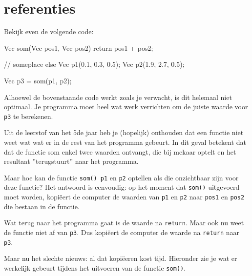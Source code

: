 \chapter{referenties}
\label{chapter:references}

Bekijk even de volgende code:

\begin{code}
Vec som(Vec pos1, Vec pos2) {
  return pos1 + pos2;
}

// someplace else
Vec p1(0.1, 0.3, 0.5);
Vec p2(1.9, 2.7, 0.5);

Vec p3 = som(p1, p2); 
\end{code}

Alhoewel de bovenstaande code werkt zoals je verwacht, is dit helemaal niet optimaal. Je programma moet heel wat werk verrichten om de juiste waarde voor \texttt{p3} te berekenen.

Uit de leerstof van het 5de jaar heb je (hopelijk) onthouden dat een functie niet weet wat wat er in de rest van het programma gebeurt. In dit geval betekent dat dat de functie som enkel twee waarden ontvangt, die bij mekaar optelt en het resultaat ''terugstuurt'' naar het programma. 

Maar hoe kan de functie \texttt{som() p1} en \texttt{p2} optellen als die onzichtbaar zijn voor deze functie? Het antwoord is eenvoudig: op het moment dat \texttt{som()} uitgevoerd moet worden, kopi\"{e}ert de computer de waarden van \texttt{p1} en \texttt{p2} naar \texttt{pos1} en \texttt{pos2} die bestaan in de functie.

Wat terug naar het programma gaat is de waarde na \texttt{return}. Maar ook nu weet de functie niet af van \texttt{p3}. Dus kopi\"{e}ert de computer de waarde na \texttt{return} naar \texttt{p3}.

Maar nu het slechte nieuws: al dat kopi\"{e}eren kost tijd. Hieronder zie je wat er werkelijk gebeurt tijdens het uitvoeren van de functie \texttt{som()}.

